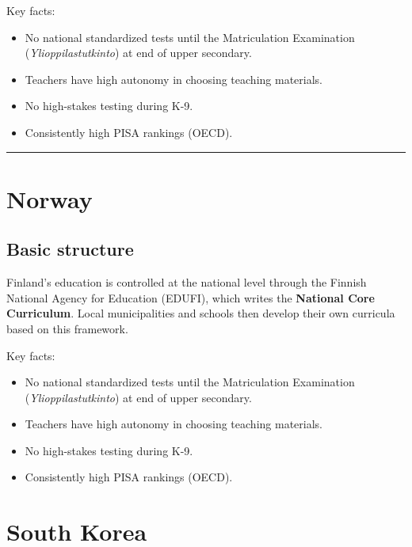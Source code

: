 Key facts:
\begin{itemize}
	\item No national standardized tests until the Matriculation Examination (\textit{Ylioppilastutkinto}) at end of upper secondary.
	\item Teachers have high autonomy in choosing teaching materials.
	\item No high-stakes testing during K-9.
	\item Consistently high PISA rankings (OECD).
\end{itemize}


\vspace{1em}
\noindent\textcolor{Rule}{\rule{\linewidth}{0.4pt}}
\vspace{0.5em}






\chapter{Norway}


\section{Basic structure}

Finland's education is controlled at the national level through the Finnish National Agency for Education (EDUFI), which writes the \textbf{National Core Curriculum}. Local municipalities and schools then develop their own curricula based on this framework.

Key facts:
\begin{itemize}
	\item No national standardized tests until the Matriculation Examination (\textit{Ylioppilastutkinto}) at end of upper secondary.
	\item Teachers have high autonomy in choosing teaching materials.
	\item No high-stakes testing during K-9.
	\item Consistently high PISA rankings (OECD).
\end{itemize}






\chapter{South Korea}


